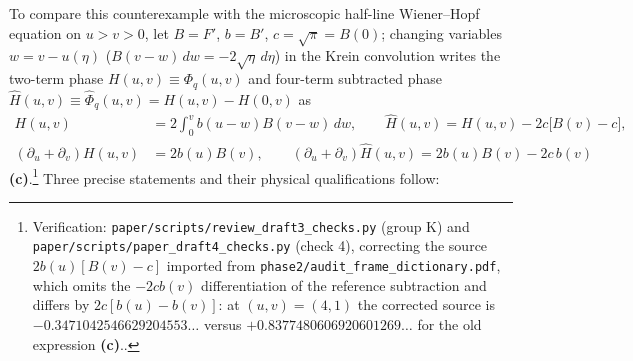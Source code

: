 \documentclass[11pt,a4paper]{article}
\newcommand{\lab}[1]{{\normalfont\sffamily\footnotesize\bfseries(#1)}}
\newcommand{\Lc}{\lab{c}}
\newcommand{\scr}[1]{\nolinkurl{#1}}
\newcommand{\chk}[1]{\footnote{\raggedright Verification: #1.}}
\theoremstyle{remark}
\begin{document}
To compare this counterexample with the microscopic half-line Wiener--Hopf equation on $u>v>0$, let $B=F'$, $b=B'$, $c=\sqrt\pi=B(0)$; changing variables $w=v-u(\eta)$ ($B(v-w)\,dw=-2\sqrt\eta\,d\eta$) in the Krein convolution writes the two-term phase $H(u,v)\equiv\Phi_q(u,v)$ and four-term subtracted phase $\widehat H(u,v)\equiv\widehat\Phi_q(u,v)=H(u,v)-H(0,v)$ as
\begin{equation}\label{eq:HhatPDE}
\begin{aligned}
H(u,v)&=2\int_0^v b(u-w)B(v-w)\,dw,\qquad
\widehat H(u,v)=H(u,v)-2c\big[B(v)-c\big],\\
(\partial_u+\partial_v)H(u,v)&=2b(u)B(v),\qquad
(\partial_u+\partial_v)\widehat H(u,v)=2b(u)B(v)-2c\,b(v)
\end{aligned}
\end{equation}
\Lc.\chk{\scr{paper/scripts/review_draft3_checks.py} (group K) and \scr{paper/scripts/paper_draft4_checks.py} (check 4), correcting the source $2b(u)[B(v)-c]$ imported from \scr{phase2/audit_frame_dictionary.pdf}, which omits the $-2cb(v)$ differentiation of the reference subtraction and differs by $2c[b(u)-b(v)]$: at $(u,v)=(4,1)$ the corrected source is $-0.3471042546629204553\ldots$ versus $+0.8377480606920601269\ldots$ for the old expression \Lc.}
Three precise statements and their physical qualifications follow:
\end{document}
